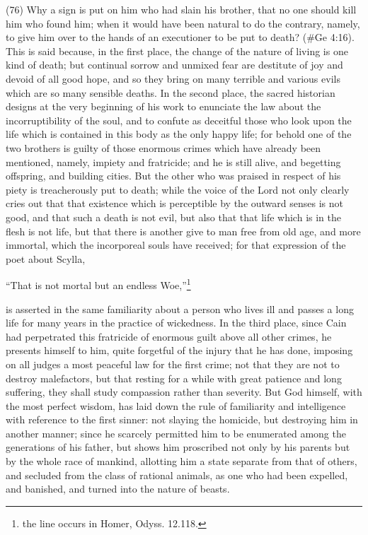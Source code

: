 (76) Why a sign is put on him who had slain his brother, that no one should kill him who found him;
when it would have been natural to do the contrary, namely, to give him over to the hands of an
executioner to be put to death? (\#Ge 4:16). This is said because, in the first place, the change
of the nature of living is one kind of death; but continual sorrow and unmixed fear are destitute of
joy and devoid of all good hope, and so they bring on many terrible and various evils which are so
many sensible deaths. In the second place, the sacred historian designs at the very beginning of
his work to enunciate the law about the incorruptibility of the soul, and to confute as deceitful those
who look upon the life which is contained in this body as the only happy life; for behold one of the
two brothers is guilty of those enormous crimes which have already been mentioned, namely,
impiety and fratricide; and he is still alive, and begetting offspring, and building cities. But the other
who was praised in respect of his piety is treacherously put to death; while the voice of the Lord
not only clearly cries out that that existence which is perceptible by the outward senses is not good,
and that such a death is not evil, but also that that life which is in the flesh is not life, but that there
is another give to man free from old age, and more immortal, which the incorporeal souls have
received; for that expression of the poet about Scylla,

``That is not mortal but an endless Woe,''\footnote{the line occurs in Homer, Odyss. 12.118.}

is asserted in the same familiarity about a person who lives ill and passes a long life for many
years in the practice of wickedness. In the third place, since Cain had perpetrated this fratricide of
enormous guilt above all other crimes, he presents himself to him, quite forgetful of the injury that
he has done, imposing on all judges a most peaceful law for the first crime; not that they are not to
destroy malefactors, but that resting for a while with great patience and long suffering, they shall
study compassion rather than severity. But God himself, with the most perfect wisdom, has laid
down the rule of familiarity and intelligence with reference to the first sinner: not slaying the
homicide, but destroying him in another manner; since he scarcely permitted him to be enumerated
among the generations of his father, but shows him proscribed not only by his parents but by the
whole race of mankind, allotting him a state separate from that of others, and secluded from the
class of rational animals, as one who had been expelled, and banished, and turned into the nature
of beasts.

